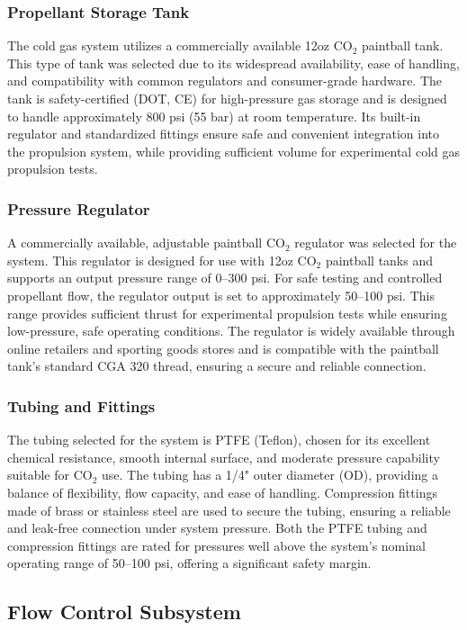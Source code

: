 \documentclass{new-aiaa}
\begin{document}
\subsubsection{Propellant Storage Tank}
The cold gas system utilizes a commercially available 12oz CO$_2$ paintball tank. This type of tank was selected due to its widespread availability, ease of handling, and compatibility with common regulators and consumer-grade hardware. The tank is safety-certified (DOT, CE) for high-pressure gas storage and is designed to handle approximately 800 psi (55 bar) at room temperature. Its built-in regulator and standardized fittings ensure safe and convenient integration into the propulsion system, while providing sufficient volume for experimental cold gas propulsion tests.

\subsubsection{Pressure Regulator}
A commercially available, adjustable paintball CO$_2$ regulator was selected for the system. This regulator is designed for use with 12oz CO$_2$ paintball tanks and supports an output pressure range of 0–300 psi. For safe testing and controlled propellant flow, the regulator output is set to approximately 50–100 psi. This range provides sufficient thrust for experimental propulsion tests while ensuring low-pressure, safe operating conditions. The regulator is widely available through online retailers and sporting goods stores and is compatible with the paintball tank's standard CGA 320 thread, ensuring a secure and reliable connection.

\subsubsection{Tubing and Fittings}

The tubing selected for the system is PTFE (Teflon), chosen for its excellent chemical resistance, smooth internal surface, and moderate pressure capability suitable for CO$_2$ use. The tubing has a 1/4" outer diameter (OD), providing a balance of flexibility, flow capacity, and ease of handling. Compression fittings made of brass or stainless steel are used to secure the tubing, ensuring a reliable and leak-free connection under system pressure. Both the PTFE tubing and compression fittings are rated for pressures well above the system's nominal operating range of 50–100 psi, offering a significant safety margin.

\subsection{Flow Control Subsystem}
\end{document}
